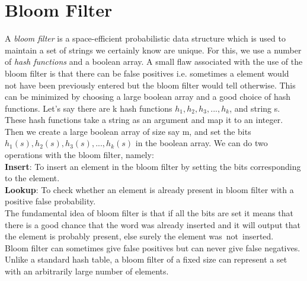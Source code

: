\documentclass[11pt,a4paper]{article}
\begin{document}
\section{Bloom Filter}
\label{sec:bloomfilter}
A \emph{bloom filter} is a space-efficient probabilistic data structure which is used to maintain a set of strings we certainly know are unique. 
For this, we use a number of \emph{hash functions} and a boolean array.
A small flaw associated with the use of the bloom filter is that there can be false positives i.e. sometimes a element would not have been previously entered but the bloom filter would tell otherwise. This can be minimized by choosing a large boolean array and a good choice of hash functions. Let's say there are k hash functions $h_1, h_2, h_3,..., h_k$, and string s.
These hash functions take a string as an argument and map it to an integer.
Then we create a large boolean array of size say m, and set the bits $h_1(s), h_2(s), h_3(s),..., h_k(s)$ in the boolean array.
We can do two operations with the bloom filter, namely: 
\\
\textbf{Insert}: To insert an element in the bloom filter by setting the bits corresponding to the element.
\\
\textbf{Lookup}: To check whether an element is already present in bloom filter with a positive false probability.
\\
The fundamental idea of bloom filter is that if all the bits are set it means that there is a good chance that the word was already inserted and it will output that the element is probably present, else surely the element was not inserted.
\\
Bloom filter can sometimes give false positives but can never give false negatives.
Unlike a standard hash table, a bloom filter of a fixed size can represent a set with an arbitrarily large number of elements.
\end{document}
